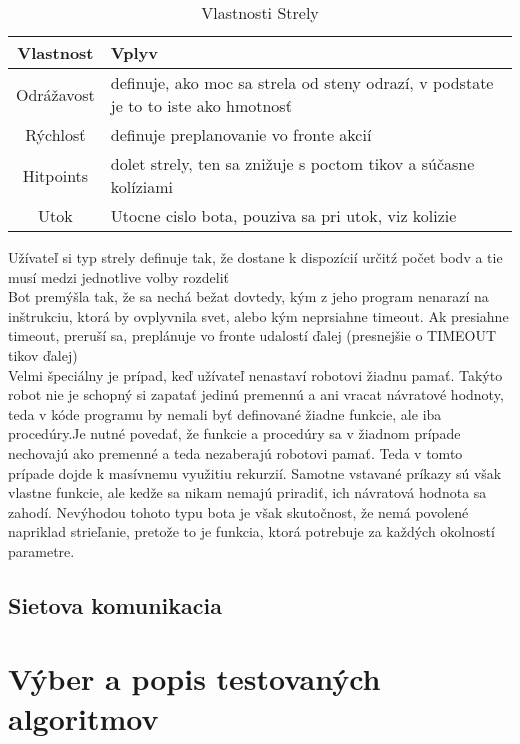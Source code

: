 \documentclass[a4paper,11pt,final]{report}
\begin{document}
\begin{table}[ht]
\caption{Vlastnosti Strely}   %
\centering                          %
\begin{tabular}{ | c | p{10cm} |}            %
\hline\hline                        %
Vlastnost & Vplyv \\   %
\hline                              %
Odrážavost & definuje, ako moc sa strela od steny odrazí, v podstate je to to iste ako hmotnosť\\ \hline
Rýchlosť & definuje preplanovanie vo fronte akcií\\ \hline
Hitpoints  & dolet strely, ten sa znižuje s poctom tikov a súčasne kolíziami\\ \hline
Utok & Utocne cislo bota, pouziva sa pri utok, viz kolizie \\ \hline
\hline                              %
\end{tabular}
\end{table}

Užívateľ si typ strely definuje tak, že dostane k dispozícií určitź počet bodv a tie musí medzi jednotlive volby rozdeliť\\
Bot premýšla tak, že sa nechá bežat dovtedy, kým z jeho program nenarazí na inštrukciu, ktorá by ovplyvnila svet, alebo kým neprsiahne timeout. Ak presiahne timeout, preruší sa, preplánuje vo fronte udalostí ďalej (presnejšie o TIMEOUT tikov ďalej)\\
Velmi špeciálny je prípad, keď užívateľ nenastaví robotovi žiadnu pamať. Takýto robot nie je schopný si zapatať jedinú premennú a ani vracat návratové hodnoty, teda v kóde programu by nemali byť definované žiadne funkcie, ale iba procedúry.Je nutné povedať, že funkcie a procedúry sa v žiadnom prípade nechovajú ako premenné a teda nezaberajú robotovi pamať. Teda v tomto prípade dojde k masívnemu využitiu rekurzií. Samotne vstavané príkazy sú však vlastne funkcie, ale kedže sa nikam nemajú priradiť, ich návratová hodnota sa zahodí. Nevýhodou tohoto typu bota je však skutočnost, že nemá povolené napriklad strieľanie, pretože to je funkcia, ktorá potrebuje za každých okolností parametre.
\section{Sietova komunikacia}
\chapter{Výber a popis testovaných algoritmov}
\end{document}
